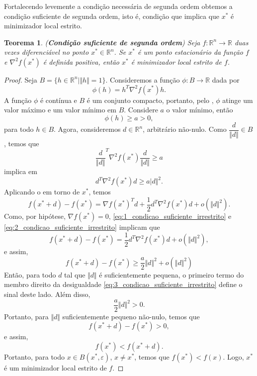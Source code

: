 \documentclass[12pt,a4paper]{scrartcl}
\def\RR{\mathds{R}}
\newtheorem{teo}{Teorema}
\theoremstyle{definition}%
\begin{document}
Fortalecendo levemente a condição necessária de segunda ordem obtemos a condição suficiente de segunda ordem, isto é, condição que implica que $x^{*}$ é minimizador local estrito.

\begin{teo}(\textbf{Condição suficiente de segunda ordem}) \label{teo:condicao_suficiente_irrestrito}
Seja $f:\RR^{n} \rightarrow \RR$ duas vezes diferenciável no ponto $x^{*} \in \RR^{n}$. Se $x^{*}$ é um ponto estacionário da função $f$ e $\nabla^{2} f(x^{*})$ é definida positiva, então $x^{*}$ é minimizador local estrito de $f$.
\end{teo}
\begin{proof}
Seja $B = \{ h\in \RR^{n} \mid \Vert h \Vert =1 \}$. Consideremos a função $\phi : B \rightarrow \RR$ dada por
\[
\phi (h) = h^{T} \nabla^{2} f(x^{*})h.
\]
A função $\phi$ é contínua e $B$ é um conjunto compacto, portanto, pelo , $\phi$ atinge um valor máximo e um valor mínimo em $B$. Considere $a$ o valor mínimo, então
\[
\phi(h) \geq a >0,
\]
para todo $h \in B$. Agora, consideremos $d\in \RR^{n}$, arbitrário não-nulo. Como $\dfrac{d}{\Vert d \Vert} \in B$, temos que
\[
{\dfrac{d}{\Vert d \Vert}}^{T} \nabla^{2} f(x^{*})\dfrac{d}{\Vert d \Vert} \geq a
\]
implica em
\[ \label{eq:1_condicao_suficiente_irrestrito}
d^{T}\nabla^{2} f(x^{*})d \geq a\vert d\Vert^{2} .
\]
Aplicando o  em torno de $x^{*}$, temos
\[\label{eq:2_condicao_suficiente_irrestrito}
f(x^{*}+d) - f(x^{*}) = \nabla f(x^{*})^{T}d + \dfrac{1}{2} d^{T}\nabla^{2} f(x^{*})d + o(\Vert d \Vert^{2}).
\]
Como, por hipótese, $\nabla f(x^{*}) = 0$, \eqref{eq:1_condicao_suficiente_irrestrito} e \eqref{eq:2_condicao_suficiente_irrestrito} implicam que
\[ 
f(x^{*}+d) - f(x^{*}) = \dfrac{1}{2} d^{T}\nabla^{2} f(x^{*})d + o(\Vert d \Vert^{2}) ,
\]
e assim, 
\[ \label{eq:3_condicao_suficiente_irrestrito}
f(x^{*}+d) - f(x^{*}) \geq \dfrac{a}{2}\Vert d \Vert^{2} + o(\Vert d \Vert^{2})
\]
Então, para todo $d$ tal que $\Vert d \Vert$ é suficientemente pequena, o primeiro termo do membro direito da desigualdade \eqref{eq:3_condicao_suficiente_irrestrito} define o sinal deste lado. Além disso,
\[
\dfrac{a}{2}\Vert d \Vert^{2} >0.
\]
Portanto, para $\Vert d \Vert$ suficientemente pequeno não-nulo, temos que 
\[
f(x^{*} + d) - f(x^{*}) >0,
\]
e assim,
\[
f(x^{*}) < f(x^{*} + d).
\]
Portanto, para todo $x \in B(x^{*}, \varepsilon)$, $x \neq x^{*}$, temos que $f(x^{*}) < f(x)$. Logo, $x^{*}$ é um minimizador local estrito de $f$.
\end{proof}
\end{document}
